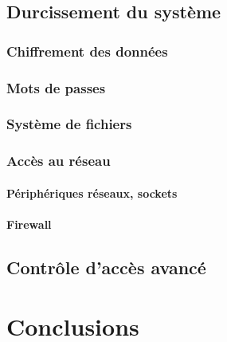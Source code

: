\documentclass[a4paper,10pt]{report}
\begin{document}
\section{Durcissement du syst\`eme}
\begin{multicols}{2}
\subsection{Chiffrement des donn\'ees}
\lipsum
\subsection{Mots de passes}
\subsection{Syst\`eme de fichiers}
\subsection{Acc\`es au r\'eseau}
\subsubsection{P\'eriph\'eriques r\'eseaux, sockets}
\subsubsection{Firewall}
\lipsum
\end{multicols}
\pagebreak
\section{Contr\^ole d'acc\`es avanc\'e}
\pagebreak
\chapter{Conclusions}
\end{document}
